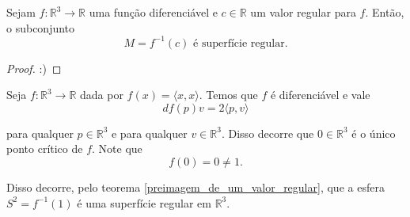 \begin{teo}\label{preimagem_de_um_valor_regular}
Sejam $f: \mathbb{R}^3 \rightarrow \mathbb{R}$ uma função diferenciável e $c \in \mathbb{R}$ um valor regular para $f$. Então, o subconjunto
\begin{equation*}
    M = f^{-1}(c) \text{ é superfície regular.}
\end{equation*}
\end{teo}

\begin{proof}
:)
\end{proof}

\begin{exemplo}
Seja $f: \mathbb{R}^3 \rightarrow \mathbb{R}$ dada por $f(x) = \langle x,x \rangle$. Temos que $f$ é diferenciável e vale
\begin{equation*}
    df(p)v = 2 \langle p,v \rangle
\end{equation*}

para qualquer $p \in \mathbb{R}^3$ e para qualquer $v \in \mathbb{R}^3$. Disso decorre que $0 \in \mathbb{R}^3$ é o único ponto crítico de $f$. Note que
\begin{equation*}
    f(0) = 0 \neq 1.
\end{equation*}

Disso decorre, pelo teorema \ref{preimagem_de_um_valor_regular}, que a esfera $S^2 = f^{-1}(1)$ é uma superfície regular em $\mathbb{R}^3$.
\end{exemplo}

